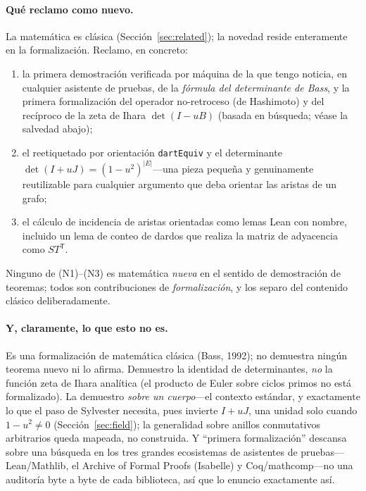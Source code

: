 \documentclass[11pt]{article}
\newcommand{\lean}[1]{\texttt{#1}}
\begin{document}
\paragraph{Qu\'e reclamo como nuevo.} La matem\'atica es cl\'asica (Secci\'on~\ref{sec:related}); la
novedad reside enteramente en la formalizaci\'on. Reclamo, en concreto:
\begin{enumerate}\itemsep1.5pt
\item[(N1)] la primera demostraci\'on verificada por m\'aquina de la que tengo noticia, en cualquier
  asistente de pruebas, de la \emph{f\'ormula del determinante de Bass}, y la primera
  formalizaci\'on del operador no-retroceso (de Hashimoto) y del rec\'iproco de la zeta de Ihara
  $\det(I-uB)$ (basada en b\'usqueda; v\'ease la salvedad abajo);
\item[(N2)] el reetiquetado por orientaci\'on \lean{dartEquiv} y el determinante
  $\det(I+uJ)=(1-u^2)^{|E|}$---una pieza peque\~na y genuinamente reutilizable para cualquier
  argumento que deba orientar las aristas de un grafo;
\item[(N3)] el c\'alculo de incidencia de aristas orientadas como lemas Lean con nombre, incluido un
  lema de conteo de dardos que realiza la matriz de adyacencia como $S T^{\mathsf T}$.
\end{enumerate}
Ninguno de (N1)--(N3) es matem\'atica \emph{nueva} en el sentido de demostraci\'on de teoremas; todos
son contribuciones de \emph{formalizaci\'on}, y los separo del contenido cl\'asico
deliberadamente.

\paragraph{Y, claramente, lo que esto no es.} Es una formalizaci\'on de matem\'atica cl\'asica (Bass,
1992); no demuestra ning\'un teorema nuevo ni lo afirma. Demuestro la identidad de determinantes,
\emph{no} la funci\'on zeta de Ihara anal\'itica (el producto de Euler sobre ciclos primos no est\'a
formalizado). La demuestro \emph{sobre un cuerpo}---el contexto est\'andar, y exactamente lo que el
paso de Sylvester necesita, pues invierte $I+uJ$, una unidad solo cuando $1-u^2\neq0$
(Secci\'on~\ref{sec:field}); la generalidad sobre anillos conmutativos arbitrarios queda mapeada, no
construida. Y ``primera formalizaci\'on'' descansa sobre una b\'usqueda en los tres grandes
ecosistemas de asistentes de pruebas---Lean/Mathlib, el Archive of Formal Proofs (Isabelle) y
Coq/mathcomp---no una auditor\'ia byte a byte de cada biblioteca, as\'i que lo enuncio exactamente
as\'i.
\end{document}
